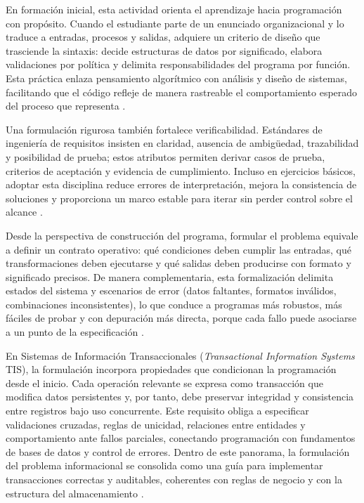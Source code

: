 \documentclass[12pt,twoside]{book}
\begin{document}
				En formación inicial, esta actividad orienta el aprendizaje hacia programación con propósito. Cuando el estudiante parte de un enunciado organizacional y lo traduce a entradas, procesos y salidas, adquiere un criterio de diseño que trasciende la sintaxis: decide estructuras de datos por significado, elabora validaciones por política y delimita responsabilidades del programa por función. Esta práctica enlaza pensamiento algorítmico con análisis y diseño de sistemas, facilitando que el código refleje de manera rastreable el comportamiento esperado del proceso que representa \cite{Pressman2019Software,SWEBOK2025Guide}.
				
				Una formulación rigurosa también fortalece verificabilidad. Estándares de ingeniería de requisitos insisten en claridad, ausencia de ambigüedad, trazabilidad y posibilidad de prueba; estos atributos permiten derivar casos de prueba, criterios de aceptación y evidencia de cumplimiento. Incluso en ejercicios básicos, adoptar esta disciplina reduce errores de interpretación, mejora la consistencia de soluciones y proporciona un marco estable para iterar sin perder control sobre el alcance \cite{ISOIECIEEE2018Requirements,ISOIECIEEE2017SoftwareLifeCycle}.
				
				Desde la perspectiva de construcción del programa, formular el problema equivale a definir un contrato operativo: qué condiciones deben cumplir las entradas, qué transformaciones deben ejecutarse y qué salidas deben producirse con formato y significado precisos. De manera complementaria, esta formalización delimita estados del sistema y escenarios de error (datos faltantes, formatos inválidos, combinaciones inconsistentes), lo que conduce a programas más robustos, más fáciles de probar y con depuración más directa, porque cada fallo puede asociarse a un punto de la especificación \cite{Gaddis2022Starting,Hanly2015Problem,Wirth1976Algorithms}.
				
				En Sistemas de Información Transaccionales (\textit{Transactional Information Systems} TIS), la formulación incorpora propiedades que condicionan la programación desde el inicio. Cada operación relevante se expresa como transacción que modifica datos persistentes y, por tanto, debe preservar integridad y consistencia entre registros bajo uso concurrente. Este requisito obliga a especificar validaciones cruzadas, reglas de unicidad, relaciones entre entidades y comportamiento ante fallos parciales, conectando programación con fundamentos de bases de datos y control de errores. Dentro de este panorama, la formulación del problema informacional se consolida como una guía para implementar transacciones correctas y auditables, coherentes con reglas de negocio y con la estructura del almacenamiento \cite{Silberschatz2020Database,Elmasri2016Database,Date2019Database}.
				
\end{document}
